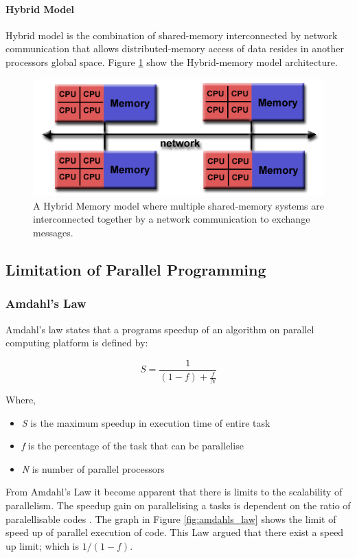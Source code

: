 \paragraph{Hybrid Model}
Hybrid model is the combination of shared-memory interconnected by network communication that allows distributed-memory access of data resides in another processors global space. Figure \ref{fig:hybrid-memory} show the Hybrid-memory model architecture.

\begin{figure}[!h]
\centering
  \includegraphics[width=.5\linewidth]{figs/hybrid-memory.png}
  \caption{A Hybrid Memory model where multiple shared-memory systems are interconnected together by a network communication  to exchange messages. \citep{Barney:16}}
  \label{fig:hybrid-memory}
\end{figure}

\citep{Barney:16}
\subsection{Limitation of Parallel Programming}
\subsubsection{Amdahl's Law}
Amdahl's law states that a programs speedup of an algorithm on parallel computing platform is defined by:

\[	S = \frac{1}{(1 - f) + \frac{f}{N}}  \]

Where,
\begin{itemize}
\item \textit{S} is the maximum speedup in execution time of entire task
\item \textit{f} is the percentage of the task that can be parallelise
\item \textit{N} is number of parallel processors 
\end{itemize}

From Amdahl's Law it become apparent that there is limits to the scalability of parallelism. The speedup gain on parallelising a tasks is dependent on the ratio of paralellisable codes \citep{Barney:16}. The graph in Figure \ref{fig:amdahls_law} shows the limit of speed up of parallel execution of code. This Law argued that there exist a  speed up limit; which is $ 1/(1-f) $.

